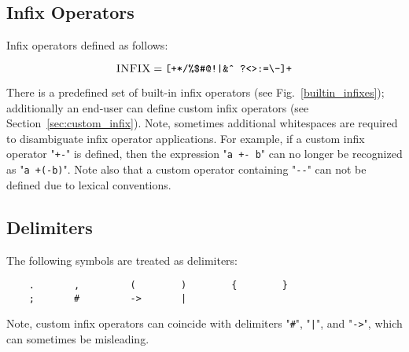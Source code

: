 \subsection{Infix Operators}

Infix operators defined as follows:

\[
\textsc{INFIX}=\mbox{\texttt{[+*/\%\$\#@!|\&\^{}~?<>:=\textbackslash-]+}}
\]

There is a predefined set of built-in infix operators (see Fig.~\ref{builtin_infixes}); additionally
an end-user can define custom infix operators (see Section~\ref{sec:custom_infix}). Note, sometimes 
additional whitespaces are required to disambiguate infix operator applications. For example, if a
custom infix operator "\lstinline|+-|" is defined, then the expression "\lstinline|a +- b|" can no longer be
recognized as "\lstinline|a +(-b)|". Note also that a custom operator containing "\lstinline|--|" can not be
defined due to lexical conventions.

\subsection{Delimiters}

The following symbols are treated as delimiters:

\begin{lstlisting}
    .       ,         (        )        {        }
    ;       #         ->       |
\end{lstlisting}

Note, custom infix operators can coincide with delimiters "\lstinline|#|", "\lstinline!|!", and "\lstinline|->|", which can
sometimes be misleading. 


